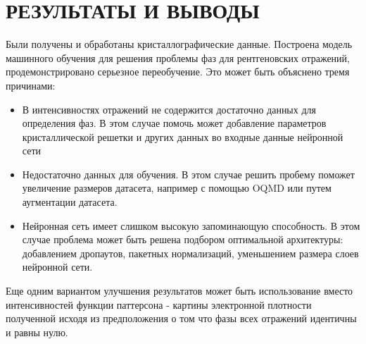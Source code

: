 \documentclass{article}
\begin{document}







\section{РЕЗУЛЬТАТЫ И ВЫВОДЫ}

Были получены и обработаны кристаллографические данные. Построена модель машинного обучения для решения проблемы фаз для рентгеновских отражений, продемонстрировано серьезное переобучение. Это может быть объяснено тремя причинами:
\begin{itemize}
\item В интенсивностях отражений не содержится достаточно данных для определения фаз. В этом случае помочь может добавление параметров кристаллической решетки и других данных во входные данные нейронной сети
\item Недостаточно данных для обучения. В этом случае решить пробему поможет увеличение размеров датасета, например с помощью OQMD или путем аугментации датасета.
\item Нейронная сеть имеет слишком высокую запоминающую способность. В этом случае проблема может быть решена подбором оптимальной архитектуры: добавлением дропаутов, пакетных нормализаций, уменьшением размера слоев нейронной сети.
\end{itemize}
Еще одним вариантом улучшения результатов может быть использование вместо интенсивностей функции паттерсона\cite{PattersonMethod} - картины электронной плотности полученной исходя из предположения о том что фазы всех отражений идентичны и равны нулю. 

\printbibliography
\end{document}
